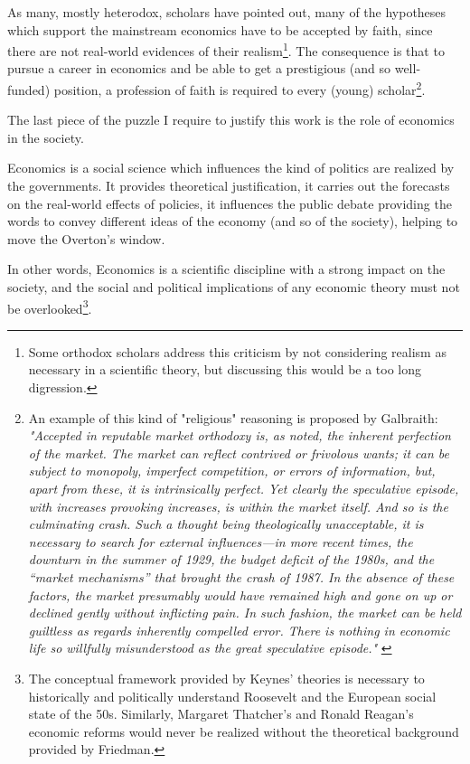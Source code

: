 \documentclass[a4paper, 11pt, headings=standardclasses, tablecaptionsbelow]{scrartcl}
\begin{document}
As many, mostly heterodox, scholars have pointed out, many of the hypotheses which support the mainstream economics have to be accepted by faith, since there are not real-world evidences of their realism\footnote{Some orthodox scholars address this criticism by not considering realism as necessary in a scientific theory, but discussing this would be a too long digression.}.
The consequence is that to pursue a career in economics and be able to get a prestigious (and so well-funded) position, a profession of faith is required to every (young) scholar\footnote{An example of this kind of "religious" reasoning is proposed by Galbraith: \textit{"Accepted in reputable market orthodoxy is, as noted, the inherent perfection of the market. The market can reflect contrived or frivolous wants; it can be subject to monopoly, imperfect competition, or errors of information, but, apart from these, it is intrinsically perfect. Yet clearly the speculative episode, with increases provoking increases, is within the market itself. And so is the culminating crash. Such a thought being theologically unacceptable, it is necessary to search for external influences—in more recent times, the downturn in the summer of 1929, the budget deficit of the 1980s, and the “market mechanisms” that brought the crash of 1987. In the absence of these factors, the market presumably would have remained high and gone on up or declined gently without inflicting pain. In such fashion, the market can be held guiltless as regards inherently compelled error. There is nothing in economic life so willfully misunderstood as the great speculative episode."} \parencite{galbraith1994}}.

The last piece of the puzzle I require to justify this work is the role of economics in the society.

Economics is a social science which influences the kind of politics are realized by the governments. It provides theoretical justification, it carries out the forecasts on the real-world effects of policies, it influences the public debate providing the words to convey different ideas of the economy (and so of the society), helping to move the Overton's window.

In other words, Economics is a scientific discipline with a strong impact on the society, and the social and political implications of any economic theory must not be overlooked\footnote{The conceptual framework provided by Keynes' theories is necessary to historically and politically understand Roosevelt and the European social state of the 50s. Similarly, Margaret Thatcher's and Ronald Reagan's economic reforms would never be realized without the theoretical background provided by Friedman.}.
\end{document}

